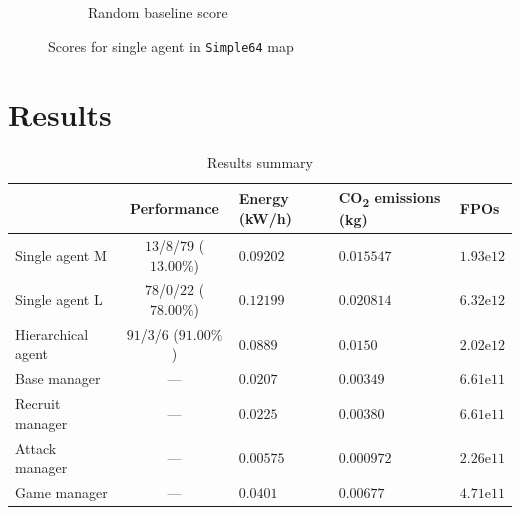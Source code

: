 \begin{figure}[t]
\begin{subfigure}[b]{0.495\textwidth}
        \caption{Random baseline score}
    \end{subfigure}
    \caption{Scores for single agent in \texttt{Simple64} map}
    \label{fig:single_Simple64_scores}
\end{figure}

\section{Results}

\begin{table}[t]
    \centering
    \begin{tabular}{ l|c l l l }
        & Performance & Energy (kW/h) & CO\textsubscript{2} emissions (kg) & FPOs \\
        \hline \hline
        Single agent M & \cellcolor{Maroon!25}$13$/$8$/$79$ ($13.00\%$) & \cellcolor{Dandelion!25}$0.09202$ & \cellcolor{Dandelion!25}$0.015547$ & \cellcolor{OliveGreen!25}$1.93\mathrm{e}12$ \\
        Single agent L & \cellcolor{Dandelion!25}$78$/$0$/$22$ ($78.00\%$) & \cellcolor{Maroon!25}$0.12199$ & \cellcolor{Maroon!25}$0.020814$ & \cellcolor{Maroon!25}$6.32\mathrm{e}12$ \\
        Hierarchical agent & \cellcolor{OliveGreen!25}$91$/$3$/$6$ ($91.00\%$) & \cellcolor{OliveGreen!25}$0.0889$ & \cellcolor{OliveGreen!25}$0.0150$ & \cellcolor{Dandelion!25}$2.02\mathrm{e}12$ \\
        \hline
        \quad Base manager & --- & $0.0207$ & $0.00349$ & $6.61\mathrm{e}11$ \\
        \quad Recruit manager & --- & $0.0225$ & $0.00380$ & $6.61\mathrm{e}11$ \\
        \quad Attack manager & --- & $0.00575$ & $0.000972$ & $2.26\mathrm{e}11$ \\
        \quad Game manager & --- & $0.0401$ & $0.00677$ & $4.71\mathrm{e}11$ \\
    \end{tabular}
    \caption{Results summary}
    \label{tab:results}
\end{table}

